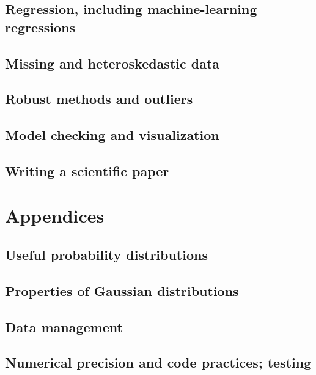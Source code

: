 \documentclass[10pt]{book}
\begin{document}
\chapter{Regression, including machine-learning regressions}

\chapter{Missing and heteroskedastic data}

\chapter{Robust methods and outliers}

\chapter{Model checking and visualization}

\chapter{Writing a scientific paper}

\appendix
\part*{Appendices}\markboth{}{}

\chapter{Useful probability distributions}

\chapter{Properties of Gaussian distributions}

\chapter{Data management}

\chapter{Numerical precision and code practices; testing}
\end{document}
